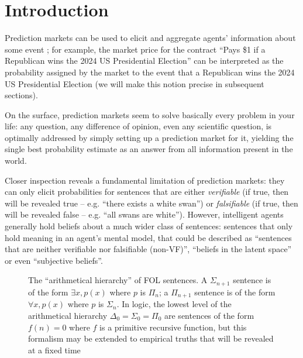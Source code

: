 \documentclass{article}
\begin{document}
\maketitle

\section{Introduction}

Prediction markets can be used to elicit and aggregate agents' information about some event \cite{conitzerPredictionMarketsMechanism2012, hansonLogarithmicMarketScoring2002, hansonCombinatorialInformationMarket2003}; for example, the market price for the contract ``Pays \$1 if a Republican wins the 2024 US Presidential Election'' can be interpreted as the probability assigned by the market to the event that a Republican wins the 2024 US Presidential Election (we will make this notion precise in subsequent sections).

On the surface, prediction markets seem to solve basically every problem in your life: any question, any difference of opinion, even any scientific question, is optimally addressed by simply setting up a prediction market for it, yielding the single best probability estimate as an answer from all information present in the world. 

Closer inspection reveals a fundamental limitation of prediction markets: they can only elicit probabilities for sentences that are either \emph{verifiable} (if true, then will be revealed true -- e.g. ``there exists a white swan'') or \emph{falsifiable} (if true, then will be revealed false -- e.g. ``all swans are white''). However, intelligent agents generally hold beliefs about a much wider class of sentences: sentences that only hold meaning in an agent's mental model, that could be described as ``sentences that are neither verifiable nor falsifiable (non-VF)'', ``beliefs in the latent space'' or even ``subjective beliefs''.

\begin{figure}
    \centering
    
    \caption{The ``arithmetical hierarchy'' of FOL sentences. A $\Sigma_{n+1}$ sentence is of the form $\exists x,p(x)$ where $p$ is $\Pi_n$; a $\Pi_{n+1}$ sentence is of the form $\forall x,p(x)$ where $p$ is $\Sigma_n$. In logic, the lowest level of the arithmetical hierarchy $\Delta_0=\Sigma_0=\Pi_0$ are sentences of the form $f(n)=0$ where $f$ is a primitive recursive function, but this formalism may be extended to empirical truths that will be revealed at a fixed time}
    \label{fig:fol}
\end{figure}
\end{document}

